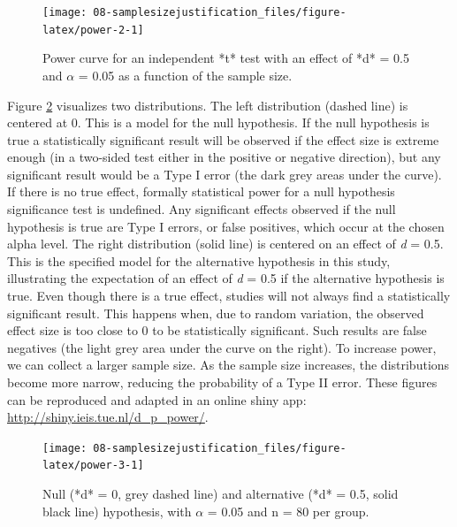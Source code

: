 \documentclass[
  oneside]{book}
\begin{document}
\begin{figure}

{\centering \texttt{[image: 08-samplesizejustification\_files/figure-latex/power-2-1]} 

}

\caption{Power curve for an independent *t* test with an effect of *d* = 0.5 and $\alpha$ = 0.05 as a function of the sample size.}\label{fig:power-2}
\end{figure}

Figure \ref{fig:power-3} visualizes two distributions. The left distribution (dashed line) is centered at 0. This is a model for the null hypothesis. If the null hypothesis is true a statistically significant result will be observed if the effect size is extreme enough (in a two-sided test either in the positive or negative direction), but any significant result would be a Type I error (the dark grey areas under the curve). If there is no true effect, formally statistical power for a null hypothesis significance test is undefined. Any significant effects observed if the null hypothesis is true are Type I errors, or false positives, which occur at the chosen alpha level. The right distribution (solid line) is centered on an effect of \emph{d} = 0.5. This is the specified model for the alternative hypothesis in this study, illustrating the expectation of an effect of \emph{d} = 0.5 if the alternative hypothesis is true. Even though there is a true effect, studies will not always find a statistically significant result. This happens when, due to random variation, the observed effect size is too close to 0 to be statistically significant. Such results are false negatives (the light grey area under the curve on the right). To increase power, we can collect a larger sample size. As the sample size increases, the distributions become more narrow, reducing the probability of a Type II error. These figures can be reproduced and adapted in an online shiny app: \url{http://shiny.ieis.tue.nl/d_p_power/}.

\begin{figure}

{\centering \texttt{[image: 08-samplesizejustification\_files/figure-latex/power-3-1]} 

}

\caption{Null (*d* = 0, grey dashed line) and alternative (*d* = 0.5, solid black line) hypothesis, with $\alpha$ = 0.05 and n = 80 per group.}\label{fig:power-3}
\end{figure}
\end{document}
